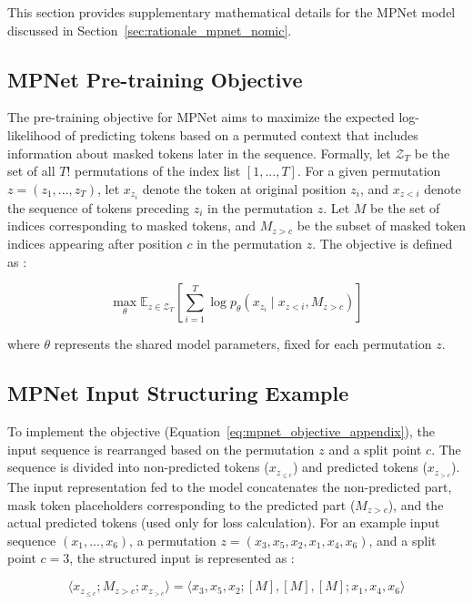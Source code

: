 \documentclass[10pt,oneside]{report}
\begin{document}
This section provides supplementary mathematical details for the MPNet model discussed in Section~\ref{sec:rationale_mpnet_nomic}.

\subsection{MPNet Pre-training Objective}

The pre-training objective for MPNet aims to maximize the expected log-likelihood of predicting tokens based on a permuted context that includes information about masked tokens later in the sequence. Formally, let $\mathcal{Z}_{T}$ be the set of all $T!$ permutations of the index list $[1,...,T]$. For a given permutation $z=(z_{1},...,z_{T})$, let $x_{z_{i}}$ denote the token at original position $z_i$, and $x_{z<i}$ denote the sequence of tokens preceding $z_i$ in the permutation $z$. Let $M$ be the set of indices corresponding to masked tokens, and $M_{z>c}$ be the subset of masked token indices appearing after position $c$ in the permutation $z$. The objective is defined as \cite{song2020mpnet}:

\begin{equation} \label{eq:mpnet_objective_appendix}
\max_{\theta} \mathbb{E}_{z\in\mathcal{Z}_{T}} \left[ \sum_{i=1}^{T} \log p_{\theta}(x_{z_{i}} \mid x_{z<i}, M_{z>c}) \right]
\end{equation}

where $\theta$ represents the shared model parameters, fixed for each permutation $z$.


\subsection{MPNet Input Structuring Example}

To implement the objective (Equation~\ref{eq:mpnet_objective_appendix}), the input sequence is rearranged based on the permutation $z$ and a split point $c$. The sequence is divided into non-predicted tokens ($x_{z_{\le c}}$) and predicted tokens ($x_{z_{>c}}$). The input representation fed to the model concatenates the non-predicted part, mask token placeholders corresponding to the predicted part ($M_{z>c}$), and the actual predicted tokens (used only for loss calculation). For an example input sequence $(x_1, ..., x_6)$, a permutation $z=(x_3, x_5, x_2, x_1, x_4, x_6)$, and a split point $c=3$, the structured input is represented as \cite{song2020mpnet}:

\begin{equation} \label{eq:mpnet_input_appendix}
\langle x_{z_{\le c}}; M_{z>c}; x_{z_{>c}} \rangle = \langle x_3, x_5, x_2; [M], [M], [M]; x_1, x_4, x_6 \rangle
\end{equation}
\end{document}
